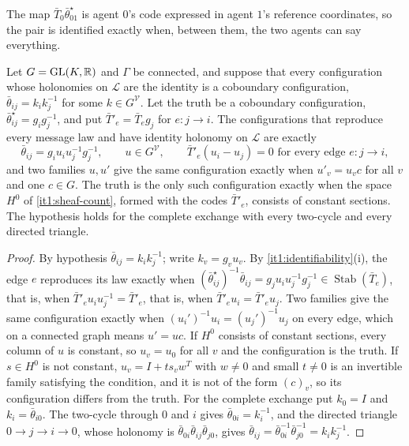 The map $\bar T_0\bar\theta^\star_{01}$ is agent $0$'s code expressed in agent $1$'s reference coordinates, so the pair is identified exactly when, between them, the two agents can say everything.

Let $G=\mathrm{GL}(K,\mathbb R)$ and $\Gamma$ be connected, and suppose that every configuration whose holonomies on $\mathcal L$ are the identity is a coboundary configuration, $\bar\theta_{ij}=k_ik_j^{-1}$ for some $k\in G^{\mathcal V}$. Let the truth be a coboundary configuration, $\bar\theta^\star_{ij}=g_ig_j^{-1}$, and put $\bar T'_e=\bar T_eg_j$ for $e:j\to i$. The configurations that reproduce every message law and have identity holonomy on $\mathcal L$ are exactly
\begin{equation}
\bar\theta_{ij}=g_iu_iu_j^{-1}g_j^{-1},\qquad u\in G^{\mathcal V},\qquad\bar T'_e(u_i-u_j)=0\text{ for every edge }e:j\to i,
\label{it1:exact-flat-eq}
\end{equation}
and two families $u,u'$ give the same configuration exactly when $u'_v=u_vc$ for all $v$ and one $c\in G$. The truth is the only such configuration exactly when the space $H^0$ of \cref{it1:sheaf-count}, formed with the codes $\bar T'_e$, consists of constant sections. The hypothesis holds for the complete exchange with every two-cycle and every directed triangle.
\begin{proof}
By hypothesis $\bar\theta_{ij}=k_ik_j^{-1}$; write $k_v=g_vu_v$. By \cref{it1:identifiability}(i), the edge $e$ reproduces its law exactly when $(\bar\theta^\star_{ij})^{-1}\bar\theta_{ij}=g_ju_iu_j^{-1}g_j^{-1}\in\operatorname{Stab}(\bar T_e)$, that is, when $\bar T'_eu_iu_j^{-1}=\bar T'_e$, that is, when $\bar T'_eu_i=\bar T'_eu_j$. Two families give the same configuration exactly when $(u_i')^{-1}u_i=(u_j')^{-1}u_j$ on every edge, which on a connected graph means $u'=uc$. If $H^0$ consists of constant sections, every column of $u$ is constant, so $u_v=u_0$ for all $v$ and the configuration is the truth. If $s\in H^0$ is not constant, $u_v=I+ts_vw^T$ with $w\neq0$ and small $t\neq0$ is an invertible family satisfying the condition, and it is not of the form $(c)_v$, so its configuration differs from the truth. For the complete exchange put $k_0=I$ and $k_i=\bar\theta_{i0}$. The two-cycle through $0$ and $i$ gives $\bar\theta_{0i}=k_i^{-1}$, and the directed triangle $0\to j\to i\to0$, whose holonomy is $\bar\theta_{0i}\bar\theta_{ij}\bar\theta_{j0}$, gives $\bar\theta_{ij}=\bar\theta_{0i}^{-1}\bar\theta_{j0}^{-1}=k_ik_j^{-1}$.
\end{proof}

